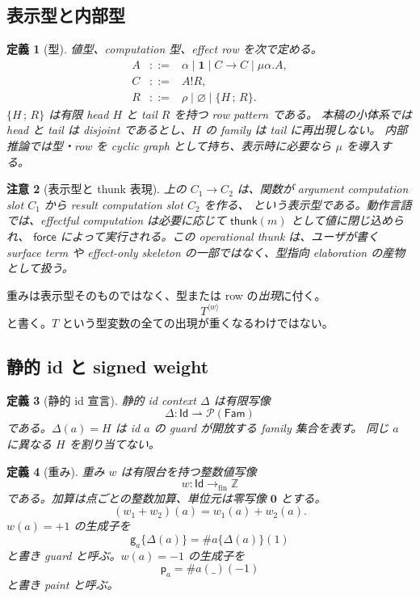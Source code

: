 \documentclass[uplatex,dvipdfmx,a4paper,11pt]{jsarticle}
\theoremstyle{jpplain}
\newtheorem{definition}{定義}[section]
\newtheorem{remark}[definition]{注意}
\newcommand{\Fam}{\mathsf{Fam}}
\newcommand{\Id}{\mathsf{Id}}
\newcommand{\Unit}{\mathbf 1}
\newcommand{\Int}{\mathbb Z}
\newcommand{\Pow}{\mathcal P}
\newcommand{\eff}{\mathbin{!}}
\newcommand{\row}[2]{\{#1\,;\,#2\}}
\newcommand{\emptyrow}{\varnothing}
\newcommand{\gatom}[2]{\mathsf g_{#1}\!\{#2\}}
\newcommand{\patom}[1]{\mathsf p_{#1}}
\newcommand{\zeroW}{\mathbf 0}
\newcommand{\wocc}[2]{#1^{\langle #2\rangle}}
\newcommand{\thunk}{\mathsf{thunk}}
\newcommand{\force}{\mathsf{force}}
\begin{document}
\subsection{表示型と内部型}

\begin{definition}[型]
値型、computation 型、effect row を次で定める。
\[
\begin{array}{rcl}
 A &::=& \alpha \mid \Unit \mid C\to C \mid \mu\alpha.A,\\
 C &::=& A\eff R,\\
 R &::=& \rho \mid \emptyrow \mid \row H R.
\end{array}
\]
$\row H R$ は有限 head $H$ と tail $R$ を持つ row pattern である。
本稿の小体系では head と tail は disjoint であるとし、$H$ の family は tail に再出現しない。
内部推論では型・row を cyclic graph として持ち、表示時に必要なら $\mu$ を導入する。
\end{definition}

\begin{remark}[表示型と thunk 表現]
上の \(C_1\to C_2\) は、関数が argument computation slot \(C_1\) から result computation slot \(C_2\) を作る、
という表示型である。動作言語では、effectful computation は必要に応じて \(\thunk(m)\) として値に閉じ込められ、
\(\force\) によって実行される。この operational thunk は、ユーザが書く surface term や
effect-only skeleton の一部ではなく、型指向 elaboration の産物として扱う。
\end{remark}

重みは表示型そのものではなく、型または row の\emph{出現}に付く。
\[
  \wocc T w
\]
と書く。$T$ という型変数の全ての出現が重くなるわけではない。

\subsection{静的 id と signed weight}

\begin{definition}[静的 id 宣言]
静的 id context $\Delta$ は有限写像
\[
  \Delta : \Id \rightharpoonup \Pow(\Fam)
\]
である。$\Delta(a)=H$ は id $a$ の guard が開放する family 集合を表す。
同じ $a$ に異なる $H$ を割り当てない。
\end{definition}

\begin{definition}[重み]
重み $w$ は有限台を持つ整数値写像
\[
  w:\Id\to_{\mathrm{fin}}\Int
\]
である。加算は点ごとの整数加算、単位元は零写像 $\zeroW$ とする。
\[
  (w_1+w_2)(a)=w_1(a)+w_2(a).
\]
$w(a)=+1$ の生成子を
\[
  \gatom a{\Delta(a)}=\#a\{\Delta(a)\}(1)
\]
と書き \emph{guard} と呼ぶ。$w(a)=-1$ の生成子を
\[
  \patom a=\#a(\_)(-1)
\]
と書き \emph{paint} と呼ぶ。
\end{definition}
\end{document}
